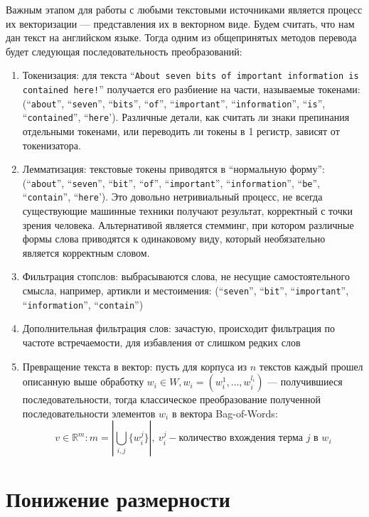 \documentclass[pdftex,14pt,a4paper]{extreport}
\begin{document}
Важным этапом для работы с любыми текстовыми источниками является процесс их векторизации --- представления их в векторном
виде. Будем считать, что нам дан текст на английском языке. Тогда одним из общепринятых методов перевода будет следующая
последовательность преобразований:
\begin{enumerate}
\item Токенизация\cite{info_retrieval}: для текста ``\texttt{About seven bits of important information is contained here!}'' получается
его разбиение на части, называемые токенами: (``\texttt{about}'', ``\texttt{seven}'', ``\texttt{bits}'', ``\texttt{of}'',
``\texttt{important}'', ``\texttt{information}'', ``\texttt{is}'', ``\texttt{contained}'', ``\texttt{here}'). Различные детали, как считать ли знаки препинания отдельными токенами, или переводить ли токены в 1 регистр, зависят от
токенизатора.
\item Лемматизация\cite{info_retrieval}: текстовые токены приводятся в ``нормальную форму'':
(``\texttt{about}'', ``\texttt{seven}'', ``\texttt{bit}'', ``\texttt{of}'',
``\texttt{important}'', ``\texttt{information}'', ``\texttt{be}'', ``\texttt{contain}'', ``\texttt{here}').
Это довольно нетривиальный процесс, не всегда существующие машинные техники получают результат, корректный с точки
зрения человека. Альтернативой является стемминг, при котором различные формы слова приводятся к одинаковому виду,
который необязательно является корректным словом.
\item Фильтрация стопслов: выбрасываются слова, не несущие самостоятельного смысла, например, артикли и местоимения:
(``\texttt{seven}'', ``\texttt{bit}'', ``\texttt{important}'', ``\texttt{information}'', ``\texttt{contain}'')
\item Дополнительная фильтрация слов: зачастую, происходит фильтрация по частоте встречаемости, для избавления от слишком редких
слов
\item Превращение текста в вектор: пусть для корпуса из $n$ текстов каждый прошел описанную выше обработку $w_i \in W,
w_i=(w_i^1,\ldots,w_i^{l_i})$ --- получившиеся последовательности, тогда классическое преобразование
полученной последовательности элементов $w_i$ в вектора Bag-of-Words\cite{info_retrieval}:
\begin{equation}
v\in\mathbb{R}^m: m=\left|\bigcup_{i,j} \{w^j_i\}\right|,\ v^j_i - \text{количество вхождения терма } j\text{ в } w_i
\end{equation}
\end{enumerate}

\section{Понижение размерности}
\end{document}

